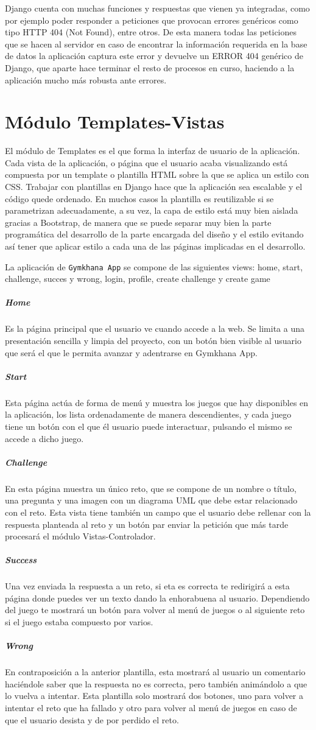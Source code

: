 \documentclass[a4paper, 12pt]{book}
\begin{document}
Django cuenta con muchas funciones y respuestas que vienen ya integradas, como por ejemplo poder responder a peticiones que provocan errores genéricos como tipo HTTP 404 (Not Found), entre otros. De esta manera todas las peticiones que se hacen al servidor en caso de encontrar la información requerida en la base de datos la aplicación captura este error y devuelve un ERROR 404 genérico de Django, que aparte hace terminar el resto de procesos en curso, haciendo a la aplicación mucho más robusta ante errores. 


\section{Módulo Templates-Vistas}
El módulo de Templates es el que forma la interfaz de usuario de la aplicación. Cada vista de la aplicación, o página que el usuario acaba visualizando está compuesta por un template o plantilla HTML sobre la que se aplica un estilo con CSS. Trabajar con plantillas en Django hace que la aplicación sea escalable y el código quede ordenado. En muchos casos la plantilla es reutilizable si se parametrizan adecuadamente, a su vez, la capa de estilo está muy bien aislada gracias a Bootstrap, de manera que se puede separar muy bien la parte programática del desarrollo de la parte encargada del diseño y el estilo evitando así tener que aplicar estilo a cada una de las páginas implicadas en el desarrollo. 

La aplicación de \texttt{Gymkhana App} se compone de las siguientes views: home, start, challenge, succes y wrong, login, profile, create challenge y create game
\subparagraph{Home}
Es la página principal que el usuario ve cuando accede a la web. Se limita a una presentación sencilla y limpia del proyecto, con un botón bien visible al usuario que será el que le permita avanzar y adentrarse en Gymkhana App. 
\subparagraph{Start}
Esta página actúa de forma de menú y muestra los juegos que hay disponibles en la aplicación, los lista ordenadamente de manera descendientes, y cada juego tiene un botón con el que él usuario puede interactuar, pulsando el mismo se accede a dicho juego.  
\subparagraph{Challenge} 
En esta página muestra un único reto, que se compone de un nombre o título, una pregunta y una imagen con un diagrama UML que debe estar relacionado con el reto. Esta vista tiene también un campo que el usuario debe rellenar con la respuesta planteada al reto y un botón par enviar la petición que más tarde procesará el módulo Vistas-Controlador.
\subparagraph{Success}
Una vez enviada la respuesta a un reto, si eta es correcta te redirigirá a esta página donde puedes ver un texto dando la enhorabuena al usuario. Dependiendo del juego te mostrará un botón para volver al menú de juegos o al siguiente reto si el juego estaba compuesto por varios. 
\subparagraph{Wrong}
En contraposición a la anterior plantilla, esta mostrará al usuario un comentario haciéndole saber que la respuesta no es correcta, pero también animándolo a que lo vuelva a intentar. Esta plantilla solo mostrará dos botones, uno para volver a intentar el reto que ha fallado y otro para volver al menú de juegos en caso de que el usuario desista y de por perdido el reto. 
\end{document}
